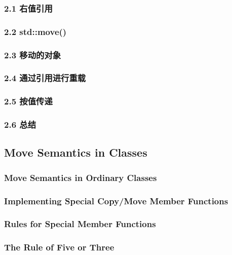 \documentclass[11pt,a4paper,UTF8]{ctexart}
\begin{document}
		\subsubsection{2.1 右值引用}
		
		\subsubsection{2.2 std::move()}
		
		\subsubsection{2.3 移动的对象}
		
		\subsubsection{2.4 通过引用进行重载}
		
		\subsubsection{2.5 按值传递}
		
		\subsubsection{2.6 总结}
		
	\subsection{Move Semantics in Classes}
		\subsubsection{Move Semantics in Ordinary Classes}
		\subsubsection{Implementing Special Copy/Move Member Functions}
		\subsubsection{Rules for Special Member Functions}
		\subsubsection{The Rule of Five or Three}
\end{document}
